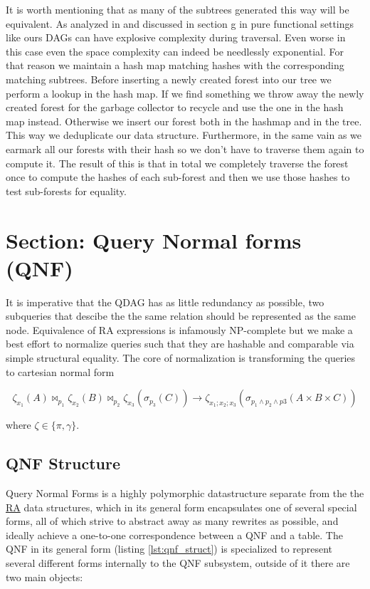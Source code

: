 It is worth mentioning that as many of the subtrees generated this way
will be equivalent. As analyzed in
\cite{selsamSealingPointerbasedOptimizations2020} and discussed in
section g in pure functional settings like ours DAGs can
have explosive complexity during traversal. Even worse in this case
even the space complexity can indeed be needlessly exponential. For
that reason we maintain a hash map matching hashes with the
corresponding matching subtrees. Before inserting a newly created
forest into our tree we perform a lookup in the hash map. If we find
something we throw away the newly created forest for the garbage
collector to recycle and use the one in the hash map
instead. Otherwise we insert our forest both in the hashmap and in the
tree. This way we deduplicate our data structure. Furthermore, in the
same vain as \cite{selsamSealingPointerbasedOptimizations2020} we
earmark all our forests with their hash so we don't have to traverse
them again to compute it. The result of this is that in total we
completely traverse the forest once to compute the hashes of each
sub-forest and then we use those hashes to test sub-forests for
equality.

\section{Section: Query Normal forms (QNF)}
\label{sec:qnf}

It is imperative that the QDAG has as little redundancy as possible,
two subqueries that descibe the the same relation should be
represented as the same node. Equivalence of RA expressions is
infamously NP-complete
\cite{sagivEquivalencesRelationalExpressions1980} but we make a best
effort to normalize queries such that they are hashable and comparable
via simple structural equality. The core of normalization is
transforming the queries to cartesian normal form

\[
  \zeta_{x_1}(A) \Join_{p_1} \zeta_{x_2}(B) \Join_{p_2} \zeta_{x_3} (\sigma_{p_3}(C)) \to \zeta_{x_1;x_2;x_3}(\sigma_{p_1 \land p_2 \land p3}(A \times B \times C))
\]

where \(\zeta \in \{\pi,\gamma\}\).


\subsection{QNF Structure}

Query Normal Forms is a highly polymorphic datastructure separate from
the the \hyperref[sec:relational_algebra_semantics]{RA} data structures, which in its general form encapsulates one
of several special forms, all of which strive to abstract away as many
rewrites as possible, and ideally achieve a one-to-one correspondence
between a QNF and a table. The QNF in its general form (listing
\ref{lst:qnf_struct}) is specialized to represent several different forms
internally to the QNF subsystem, outside of it there are two main
objects:

